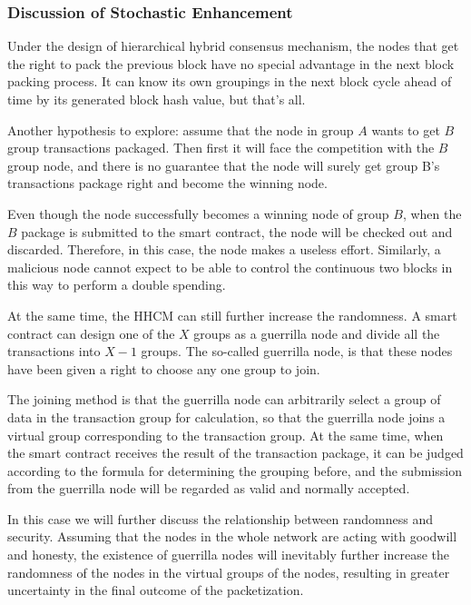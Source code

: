 \documentclass[a4paper,12pt]{article}
\begin{document}
\subsubsection {Discussion of Stochastic Enhancement}

Under the design of hierarchical hybrid consensus mechanism, the nodes that get the right to pack the previous block have no special advantage in the next block packing process. It can know its own groupings in the next block cycle ahead of time by its generated block hash value, but that's all.

Another hypothesis to explore: assume that the node in group $A$ wants to get $B$ group transactions packaged. Then first it will face the competition with the $B$ group node, and there is no guarantee that the node will surely get group B's transactions package right and become the winning node.

Even though the node successfully becomes a winning node of group $B$, when the $B$ package is submitted to the smart contract, the node will be checked out and discarded. Therefore, in this case, the node makes a useless effort. Similarly, a malicious node cannot expect to be able to control the continuous two blocks in this way to perform a double spending.

At the same time, the HHCM can still further increase the randomness. A smart contract can design one of the $X$ groups as a guerrilla node and divide all the transactions into $X-1$ groups. The so-called guerrilla node, is that these nodes have been given a right to choose any one group to join.

The joining method is that the guerrilla node can arbitrarily select a group of data in the transaction group for calculation, so that the guerrilla node joins a virtual group corresponding to the transaction group. At the same time, when the smart contract receives the result of the transaction package, it can be judged according to the formula for determining the grouping before, and the submission from the guerrilla node will be regarded as valid and normally accepted.

In this case we will further discuss the relationship between randomness and security. Assuming that the nodes in the whole network are acting with goodwill and honesty, the existence of guerrilla nodes will inevitably further increase the randomness of the nodes in the virtual groups of the nodes, resulting in greater uncertainty in the final outcome of the packetization.
\end{document}
